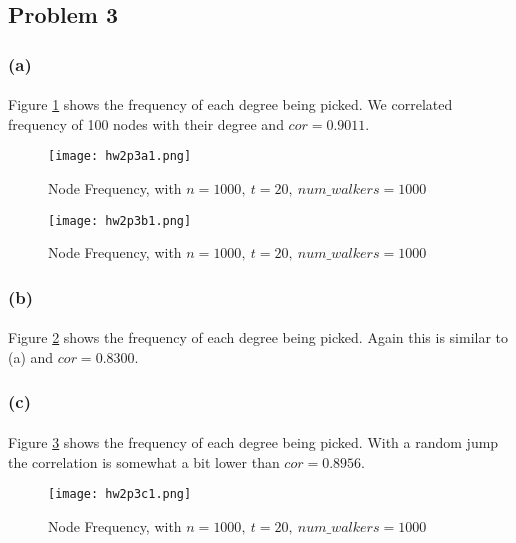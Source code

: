 \subsection*{Problem 3}
\subsubsection*{(a)}
\paragraph{}
Figure \ref{fig:c1} shows the frequency of each degree being picked. We correlated frequency of 100 nodes with their degree and $cor = 0.9011$. 
\begin{figure} [h!]
	\centering
	\texttt{[image: hw2p3a1.png]}
	\caption{Node Frequency, with $n = 1000,\ t = 20,\ num\_walkers = 1000$}
	\label{fig:c1}
\end{figure}

\begin{figure} [h!]
	\centering
	\texttt{[image: hw2p3b1.png]}
	\caption{Node Frequency, with $n = 1000,\ t = 20,\ num\_walkers = 1000$}
	\label{fig:c2}
\end{figure}
\subsubsection*{(b)}
\paragraph{}
Figure \ref{fig:c2} shows the frequency of each degree being picked. Again this is similar to (a) and $cor=0.8300$.
\subsubsection*{(c)}
\paragraph{}
Figure \ref{fig:c3} shows the frequency of each degree being picked. With a random jump the correlation is somewhat a bit lower than $cor=0.8956$.
\begin{figure} [h!]
	\centering
	\texttt{[image: hw2p3c1.png]}
	\caption{Node Frequency, with $n = 1000,\ t = 20,\ num\_walkers = 1000$}
	\label{fig:c3}
\end{figure}